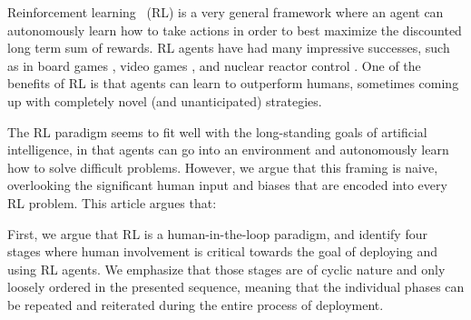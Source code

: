 \documentclass[twoside,11pt]{article}
\begin{document}
%

Reinforcement learning~\cite{SuttonBarto:2018:RLIntroduction} (RL) is a very general framework where an agent can autonomously learn how to take actions in order to best maximize the discounted long term sum of rewards. RL agents have had many impressive successes, such as in board games \cite{}, video games \cite{}, and nuclear reactor control \cite{}. One of the benefits of RL is that agents can learn to outperform humans, sometimes coming up with completely novel (and unanticipated) strategies.

The RL paradigm seems to fit well with the long-standing goals of artificial intelligence, in that agents can go into an environment and autonomously learn how to solve difficult problems. However, we argue that this framing is naive, overlooking the significant human input and biases that are encoded into every RL problem. This article argues that: 
\begin{center}
\end{center}

First, we argue that RL is a human-in-the-loop paradigm, and identify four stages where human involvement is critical towards the goal of deploying and using RL agents. We emphasize that those stages are of cyclic nature and only loosely ordered in the presented sequence, meaning that the individual phases can be repeated and reiterated during the entire process of deployment.
\end{document}
